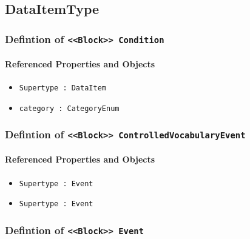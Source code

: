 \subsection{DataItemType} \label{model:DataItemType}
\subsubsection{Defintion of \texttt{<<Block>> Condition}}
  \label{type:Condition}

\FloatBarrier



\FloatBarrier
\paragraph{Referenced Properties and Objects}

\begin{itemize}
\item \texttt{Supertype : DataItem}

\item \texttt{category : CategoryEnum}

\end{itemize}
\FloatBarrier
\subsubsection{Defintion of \texttt{<<Block>> ControlledVocabularyEvent}}
  \label{type:ControlledVocabularyEvent}

\FloatBarrier



\FloatBarrier
\paragraph{Referenced Properties and Objects}

\begin{itemize}
\item \texttt{Supertype : Event}

\item \texttt{Supertype : Event}

\end{itemize}
\FloatBarrier
\subsubsection{Defintion of \texttt{<<Block>> Event}}
  \label{type:Event}

\FloatBarrier



